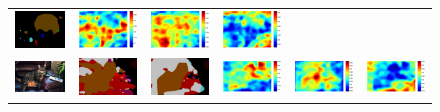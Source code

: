 \documentclass[10pt,twocolumn,letterpaper]{article}
\begin{document}
\begin{figure}
\begin{tabular}{c c c c c c}
   \includegraphics[height=0.1\linewidth]{fig/coco/res_sharenet/COCO_val2014_000000000042.png} &
   \includegraphics[height=0.1\linewidth]{fig/coco/att1/COCO_val2014_000000000042.pdf} &
   \includegraphics[height=0.1\linewidth]{fig/coco/att2/COCO_val2014_000000000042.pdf} &
   \includegraphics[height=0.1\linewidth]{fig/coco/att3/COCO_val2014_000000000042.pdf} \\
   \includegraphics[height=0.087\linewidth]{fig/coco/img/COCO_val2014_000000000599.jpg} &
   \includegraphics[height=0.087\linewidth]{fig/coco/res_baseline/COCO_val2014_000000000599.png} &
   \includegraphics[height=0.087\linewidth]{fig/coco/res_sharenet/COCO_val2014_000000000599.png} &
   \includegraphics[height=0.087\linewidth]{fig/coco/att1/COCO_val2014_000000000599.pdf} &
   \includegraphics[height=0.087\linewidth]{fig/coco/att2/COCO_val2014_000000000599.pdf} &
   \includegraphics[height=0.087\linewidth]{fig/coco/att3/COCO_val2014_000000000599.pdf} \\

\end{tabular}
\end{figure}
\end{document}
